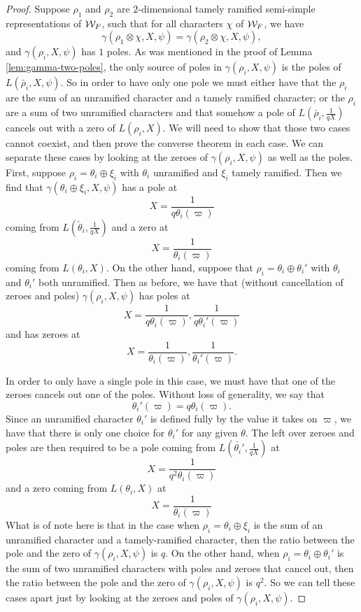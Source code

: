 \begin{proof}
  Suppose $\rho_1$ and $\rho_2$ are $2$-dimensional tamely ramified semi-simple representations of $\mathcal{W}_F$, such that for all characters $\chi$ of $\mathcal{W}_F$, we have
  \[\gamma(\rho_1 \otimes \chi,X,\psi) = \gamma(\rho_2 \otimes \chi,X,\psi),\]
  and $\gamma(\rho_i,X,\psi)$ has $1$ poles.
  As was mentioned in the proof of Lemma \ref{lem:gamma-two-poles}, the only source of poles in $\gamma(\rho_i,X,\psi)$ is the poles of $L(\check{\rho_i},X,\psi)$.
  So in order to have only one pole we must either have that the $\rho_i$ are the sum of an unramified character and a tamely ramified character; or the $\rho_i$ are a sum of two unramified characters and that somehow a pole of $L(\check{\rho_i},\frac{1}{qX})$ cancels out with a zero of $L(\rho_i,X)$.
  We will need to show that those two cases cannot coexist, and then prove the converse theorem in each case.
  We can separate these cases by looking at the zeroes of $\gamma(\rho_i,X,\psi)$ as well as the poles.
  First, suppose $\rho_i = \theta_i \oplus \xi_i$ with $\theta_i$ unramified and $\xi_i$ tamely ramified.
  Then we find that $\gamma(\theta_i \oplus \xi_i,X,\psi)$ has a pole at
  \[X= \frac{1}{q\theta_i(\varpi)}\]
  coming from $L(\check{\theta}_i,\frac{1}{qX})$ and a zero at
  \[X = \frac{1}{\theta_i(\varpi)}\]
  coming from $L(\theta_i,X)$.
  On the other hand, suppose that $\rho_i = \theta_i \oplus \theta_i'$ with $\theta_i$ and $\theta_i'$ both unramified.
  Then as before, we have that (without cancellation of zeroes and poles)  $\gamma(\rho_i,X,\psi)$ has poles at
  \[X = \frac{1}{q\theta_i(\varpi)}, \frac{1}{q\theta_i'(\varpi)}\]
  and has zeroes at
  \[X = \frac{1}{\theta_i(\varpi)}, \frac{1}{\theta_i'(\varpi)}.\]


  In order to only have a single pole in this case, we must have that one of the zeroes cancels out one of the poles.
  Without loss of generality, we say that 
  \[\theta_i'(\varpi) = q\theta_i(\varpi).\]
  Since an unramified character $\theta_i'$ is defined fully by the value it takes on $\varpi$, we have that there is only one choice for $\theta_i'$ for any given $\theta$.
  The left over zeroes and poles are then required to be a pole coming from $L(\check{\theta_i'},\frac{1}{qX})$ at 
  \[X = \frac{1}{q^2 \theta_i(\varpi)}\]
  and a zero coming from $L(\theta_i,X)$ at
  \[X = \frac{1}{\theta_i(\varpi)}\]
  What is of note here is that in the case when $\rho_i = \theta_i \oplus \xi_i$ is the sum of an unramified character and a tamely-ramified character, then the ratio between the pole and the zero of $\gamma(\rho_i,X,\psi)$ is $q$.
  On the other hand, when $\rho_i = \theta_i \oplus \theta_i'$ is the sum of two unramified characters with poles and zeroes that cancel out, then the ratio between the pole and the zero of $\gamma(\rho_i,X,\psi)$ is $q^2$.
  So we can tell these cases apart just by looking at the zeroes and poles of $\gamma(\rho_i,X,\psi)$.



\end{proof}
